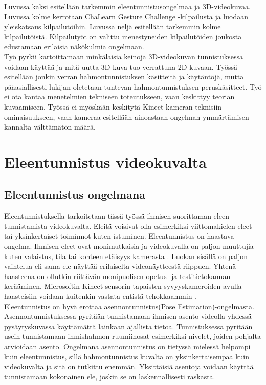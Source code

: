 Luvussa kaksi esitellään tarkemmin eleentunnistusongelmaa ja 3D-videokuvaa. Luvussa kolme kerrotaan
ChaLearn Gesture Challenge -kilpailusta ja luodaan yleiskatsaus kilpailutöihin. Luvussa neljä esitellään
tarkemmin kolme kilpailutöistä. Kilpailutyöt on valittu menestyneiden kilpailutöiden joukosta edustamaan erilaisia näkökulmia ongelmaan.\\

Työ pyrkii kartoittamaan minkälaisia keinoja 3D-videokuvan tunnistuksessa voidaan käyttää ja mitä uutta 3D-kuva tuo verrattuna 2D-kuvaan.
Työssä esitellään jonkin verran hahmontunnistuksen käsitteitä ja käytäntöjä, mutta pääasiallisesti lukijan oletetaan tuntevan hahmontunnistuksen 
peruskäsitteet. Työ ei ota kantaa menetelmien tekniseen toteutukseen, vaan keskittyy teorian kuvaamiseen. Työssä ei myöskään keskitytä Kinect-kameran
teknisiin ominaisuukseen, vaan kameraa esitellään ainoastaan ongelman ymmärtämisen kannalta välttämätön määrä.


\section{Eleentunnistus videokuvalta}
\label{eleentunnistus videokuvalta}


\subsection{Eleentunnistus ongelmana}
Eleentunnistuksella tarkoitetaan tässä työssä ihmisen suorittaman eleen tunnistamista videokuvalta. Eleitä voisivat olla esimerkiksi
viittomakielen eleet tai yksinkertaiset toiminnot kuten istuminen. Eleentunnistus on haastava ongelma. Ihmisen eleet ovat
monimutkaisia ja videokuvalla on paljon muuttujia kuten valaistus, tila tai kohteen etäisyys kamerasta \citep {1251144}. 
Luokan sisällä on paljon vaihtelua eli sama ele näyttää erilaiselta videonäytteestä riippuen.
Yhtenä haasteena on ollutkin riittävän monipuolisen opetus- ja testitietokannan kerääminen.
\citep{4587756} Microsoftin Kinect-sensorin tapaisten syvyyskameroiden avulla haasteisiin voidaan kuitenkin vastata entistä tehokkaammin \citep {6239178}.\\

Eleentunnistus on hyvä erottaa asennontunnistus(Pose Estimation)-ongelmasta.
Asennontunnistuksessa pyritään tunnistamaan ihmisen asento videolla yhdessä pysäytyskuvassa
käyttämättä lainkaan ajallista tietoa. Tunnistuksessa pyritään usein tunnistamaan ihmishahmon ruumiinosat esimerkiksi nivelet,
joiden pohjalta arvioidaan asento. Ongelmana asennontunnistus on tietyssä mielessä helpompi
kuin eleentunnistus, sillä hahmontunnistus kuvalta on yksinkertaisempaa kuin videokuvalta ja sitä on tutkittu enemmän. 
Yksittäisiä asentoja voidaan käyttää tunnistamaan kokonainen ele, joskin se on laskennallisesti raskasta. \citep{5995316}  \\

